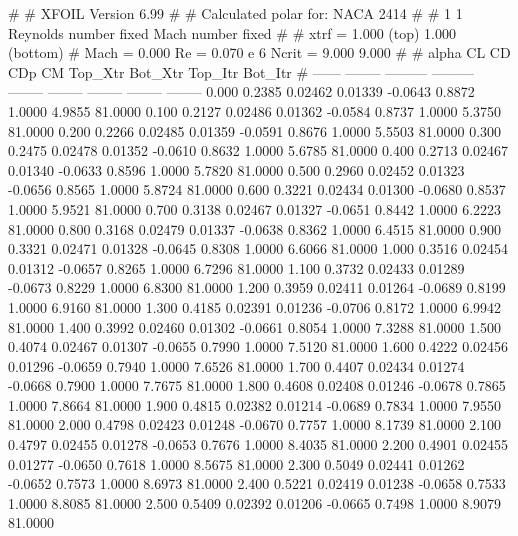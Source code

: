 #  
#       XFOIL         Version 6.99
#  
# Calculated polar for: NACA 2414                                       
#  
# 1 1 Reynolds number fixed          Mach number fixed         
#  
# xtrf =   1.000 (top)        1.000 (bottom)  
# Mach =   0.000     Re =     0.070 e 6     Ncrit =   9.000  9.000
#  
#   alpha    CL        CD       CDp       CM     Top_Xtr  Bot_Xtr  Top_Itr  Bot_Itr
#  ------ -------- --------- --------- -------- -------- -------- -------- --------
   0.000   0.2385   0.02462   0.01339  -0.0643   0.8872   1.0000   4.9855  81.0000
   0.100   0.2127   0.02486   0.01362  -0.0584   0.8737   1.0000   5.3750  81.0000
   0.200   0.2266   0.02485   0.01359  -0.0591   0.8676   1.0000   5.5503  81.0000
   0.300   0.2475   0.02478   0.01352  -0.0610   0.8632   1.0000   5.6785  81.0000
   0.400   0.2713   0.02467   0.01340  -0.0633   0.8596   1.0000   5.7820  81.0000
   0.500   0.2960   0.02452   0.01323  -0.0656   0.8565   1.0000   5.8724  81.0000
   0.600   0.3221   0.02434   0.01300  -0.0680   0.8537   1.0000   5.9521  81.0000
   0.700   0.3138   0.02467   0.01327  -0.0651   0.8442   1.0000   6.2223  81.0000
   0.800   0.3168   0.02479   0.01337  -0.0638   0.8362   1.0000   6.4515  81.0000
   0.900   0.3321   0.02471   0.01328  -0.0645   0.8308   1.0000   6.6066  81.0000
   1.000   0.3516   0.02454   0.01312  -0.0657   0.8265   1.0000   6.7296  81.0000
   1.100   0.3732   0.02433   0.01289  -0.0673   0.8229   1.0000   6.8300  81.0000
   1.200   0.3959   0.02411   0.01264  -0.0689   0.8199   1.0000   6.9160  81.0000
   1.300   0.4185   0.02391   0.01236  -0.0706   0.8172   1.0000   6.9942  81.0000
   1.400   0.3992   0.02460   0.01302  -0.0661   0.8054   1.0000   7.3288  81.0000
   1.500   0.4074   0.02467   0.01307  -0.0655   0.7990   1.0000   7.5120  81.0000
   1.600   0.4222   0.02456   0.01296  -0.0659   0.7940   1.0000   7.6526  81.0000
   1.700   0.4407   0.02434   0.01274  -0.0668   0.7900   1.0000   7.7675  81.0000
   1.800   0.4608   0.02408   0.01246  -0.0678   0.7865   1.0000   7.8664  81.0000
   1.900   0.4815   0.02382   0.01214  -0.0689   0.7834   1.0000   7.9550  81.0000
   2.000   0.4798   0.02423   0.01248  -0.0670   0.7757   1.0000   8.1739  81.0000
   2.100   0.4797   0.02455   0.01278  -0.0653   0.7676   1.0000   8.4035  81.0000
   2.200   0.4901   0.02455   0.01277  -0.0650   0.7618   1.0000   8.5675  81.0000
   2.300   0.5049   0.02441   0.01262  -0.0652   0.7573   1.0000   8.6973  81.0000
   2.400   0.5221   0.02419   0.01238  -0.0658   0.7533   1.0000   8.8085  81.0000
   2.500   0.5409   0.02392   0.01206  -0.0665   0.7498   1.0000   8.9079  81.0000
